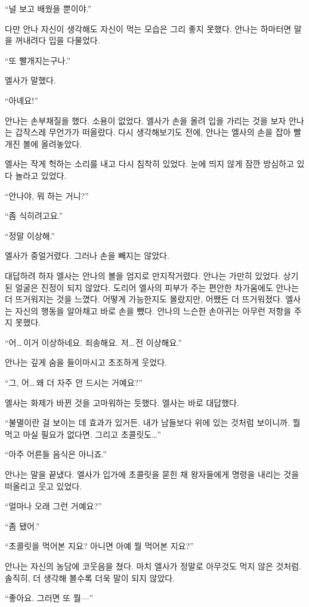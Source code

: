 ``널 보고 배웠을 뿐이야.''

다만 안나 자신이 생각해도 자신이 먹는 모습은 그리 좋지 못했다. 안나는 하마터면 말을 꺼내려다 입을 다물었다.

``또 빨개지는구나.''

엘사가 말했다.

``아녜요!''

안나는 손부채질을 했다. 소용이 없었다. 엘사가 손을 올려 입을 가리는 것을 보자 안나는 갑작스레 무언가가 떠올랐다. 다시 생각해보기도 전에, 안나는 엘사의 손을 잡아 빨개진 볼에 올려놓았다.

엘사는 작게 헉하는 소리를 내고 다시 침착히 있었다. 눈에 띄지 않게 잠깐 방심하고 있다 놀라고 있었다.

``안나야, 뭐 하는 거니?''

``좀 식히려고요.''

``정말 이상해.''

엘사가 중얼거렸다. 그러나 손을 빼지는 않았다.

대답하려 하자 엘사는 안나의 볼을 엄지로 만지작거렸다. 안나는 가만히 있었다. 상기된 얼굴은 진정이 되지 않았다. 도리어 엘사의 피부가 주는 편안한 차가움에도 안나는 더 뜨거워지는 것을 느꼈다. 어떻게 가능한지도 몰랐지만, 어쨌든 더 뜨거워졌다. 엘사는 자신의 행동을 알아채고 바로 손을 뺐다. 안나의 느슨한 손아귀는 아무런 저항을 주지 못했다.

``어\ldots\,이거 이상하네요. 죄송해요. 저\ldots\,전 이상해요.''

안나는 깊게 숨을 들이마시고 초조하게 웃었다.

``그, 어\ldots\,왜 더 자주 안 드시는 거예요?''

엘사는 화제가 바뀐 것을 고마워하는 듯했다. 엘사는 바로 대답했다.

``불멸이란 걸 보이는 데 효과가 있거든. 내가 남들보다 위에 있는 것처럼 보이니까. 뭘 먹고 마실 필요가 없다면. 그리고 초콜릿도\ldots''

``아주 어른들 음식은 아니죠.''

안나는 말을 끝냈다. 엘사가 입가에 초콜릿을 묻힌 채 왕자들에게 명령을 내리는 것을 떠올리고 웃고 있었다.

``얼마나 오래 그런 거예요?''

``좀 됐어.''

``초콜릿을 먹어본 지요? 아니면 아예 뭘 먹어본 지요?''

안나는 자신의 농담에 코웃음을 쳤다. 마치 엘사가 정말로 아무것도 먹지 않은 것처럼. 솔직히, 더 생각해 볼수록 더욱 말이 되지 않았다.

``좋아요. 그러면 또 뭘—''

